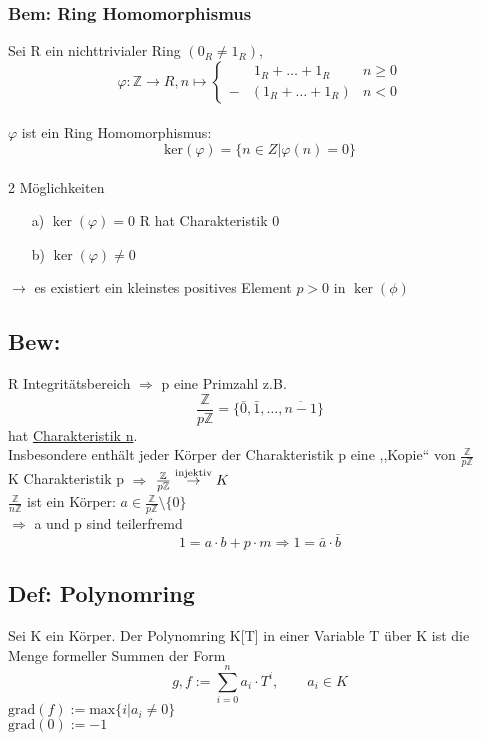 \documentclass[titlepage,12pt,a4paper,ngerman]{report}
\newcommand{\tx}[1]{\textrm{#1}}
\newcommand{\grad}{\tx{grad}}
\begin{document}
\subsubsection{Bem: Ring Homomorphismus}  Sei R ein nichttrivialer Ring $(0_{R} \neq 1_{R})$,
$$\varphi: \mathbb{Z} \to R , n \mapsto \left\{\begin{array}{lll} & \ 1_{R}+\dots + 1_{R} & n\ge 0\\ - & ( 1_{R}+\dots + 1_{R}) & n < 0 \end{array}\right.$$\\
$\varphi$ ist ein Ring Homomorphismus:
$$\tx{ker}(\varphi) = \{n\in Z | \varphi(n) = 0\}$$\\
2 Möglichkeiten
\begin{itemize}
	\item[a)] $\ker(\varphi) = {0}$
	R hat Charakteristik 0
	\item[b)] $\ker(\varphi) \neq {0}$
\end{itemize}

$\rightarrow$ es existiert ein kleinstes positives Element $p>0$ in  $\ker(\phi)$%
\subsection{Bew:} 
R Integritätsbereich $\Rightarrow$ p eine Primzahl z.B. 
\begin{equation*} \frac{\mathbb{Z}}{p\mathbb{Z}} = \{\bar{0}, \bar{1},\dots,\overline{n-1}\} \end{equation*}
hat \underline{Charakteristik n}.\\
Insbesondere enthält jeder Körper der Charakteristik p eine ,,Kopie`` von $\frac{\mathbb{Z}}{p\mathbb{Z}}$\\
K Charakteristik p $\Rightarrow$ $\frac{\mathbb{Z}}{p\mathbb{Z}} \buildrel \tx{injektiv} \over \rightarrow K$\\
$\frac{\mathbb{Z}}{n\mathbb{Z}}$ ist ein Körper:
$a \in \frac{\mathbb{Z}}{p\mathbb{Z}}\setminus \{0\}$\\
$\Rightarrow$ a und p sind teilerfremd\\
$$ 1 = a\cdot b+p\cdot m \Rightarrow 1 = \bar{a} \cdot  \bar{b}$$
\subsection{Def: Polynomring} Sei K ein Körper. Der Polynomring K[T] in einer Variable T über K ist die Menge formeller Summen der Form $$ g,f := \sum^{n}_{i=0} a_{i} \cdot T^{i}, \qquad a_i\in K $$
$\grad(f) := \textrm{max}\{i\vert a_{i} \neq 0 \}$ \\
$ \grad(0) := -1$
\end{document}
